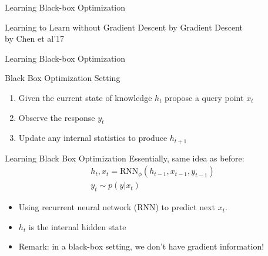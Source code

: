 \begin{frame}[c]{Learning Black-box Optimization~}

\huge
\centering
Learning to Learn without Gradient Descent by Gradient Descent\\
by Chen et al'17


\end{frame}
\begin{frame}[c]{Learning Black-box Optimization~}

\begin{block}{Black Box Optimization Setting}
\begin{enumerate}
\item Given the current state of knowledge $h_t$ propose a query point $x_t$
\item Observe the response $y_t$
\item Update any internal statistics to produce $h_{t+1}$
\end{enumerate}
\end{block}

\pause

\begin{block}{Learning Black Box Optimization}
Essentially, same idea as before:
\begin{eqnarray}
h_t, x_t = \text{RNN}_\phi(h_{t-1}, x_{t-1}, y_{t-1}) \nonumber \\
y_t \sim p(y|x_t)\nonumber
\end{eqnarray}

\begin{itemize}
\item Using recurrent neural network (RNN) to predict next $x_t$.
\item $h_t$ is the internal hidden state 
\pause
\item \alert{Remark:} in a black-box setting, we don't have gradient information!
\end{itemize}

\end{block}



\end{frame}
